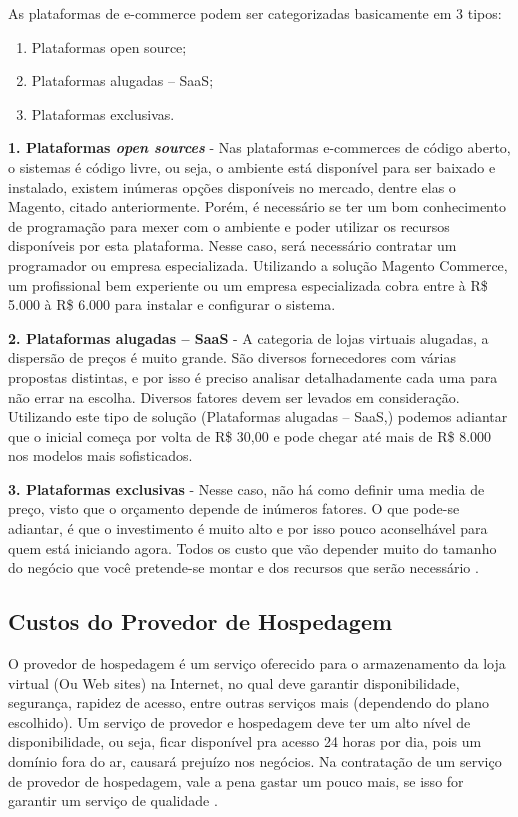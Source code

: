 As plataformas de e-commerce podem ser categorizadas basicamente em 3 tipos:

\begin{enumerate}
	\item Plataformas open source;
	\item Plataformas alugadas – SaaS;
	\item Plataformas exclusivas.
\end{enumerate}


\textbf{1. Plataformas \textit{open sources}} -  Nas plataformas e-commerces de código aberto, o sistemas é código livre, ou seja, o ambiente está disponível para ser baixado e instalado, existem inúmeras opções disponíveis no mercado, dentre elas o Magento, citado anteriormente. Porém, é necessário se ter um bom conhecimento de programação para mexer com o ambiente e poder utilizar os recursos disponíveis por esta plataforma. Nesse caso, será necessário contratar um programador ou empresa especializada. Utilizando a solução Magento Commerce, um profissional bem experiente ou um empresa especializada cobra entre à R\$ 5.000 à R\$ 6.000 para instalar e configurar o sistema.

\textbf{2. Plataformas alugadas – SaaS} - A categoria de lojas virtuais alugadas, a dispersão de preços é muito grande. São diversos fornecedores com várias propostas distintas, e por isso é preciso analisar detalhadamente cada uma para não errar na escolha. Diversos fatores devem ser levados em consideração. Utilizando este tipo de solução (Plataformas alugadas – SaaS,) podemos adiantar que o inicial começa por volta de R\$ 30,00 e pode chegar até mais de R\$ 8.000 nos modelos mais sofisticados.

\textbf{3. Plataformas exclusivas} - Nesse caso, não há como definir uma media de preço, visto que o orçamento depende de inúmeros fatores. O que pode-se adiantar, é que o investimento é muito alto e por isso pouco aconselhável para quem está iniciando agora. Todos os custo que vão depender muito do tamanho do negócio que você pretende-se montar e dos recursos que serão necessário \cite{Guiadeecommerce2014}.

\subsection{Custos do Provedor de Hospedagem}

O provedor de hospedagem é um serviço oferecido para o armazenamento da loja virtual (Ou Web sites) na Internet, no qual deve garantir disponibilidade, segurança, rapidez de acesso, entre outras serviços mais (dependendo do plano escolhido). Um serviço de provedor e hospedagem deve ter um alto nível de disponibilidade, ou seja, ficar disponível pra acesso 24 horas por dia, pois um domínio fora do ar, causará prejuízo nos negócios. Na contratação de um serviço de provedor de hospedagem, vale a pena gastar um pouco mais, se isso for garantir um serviço de qualidade \cite{Revistapegn2014}.

